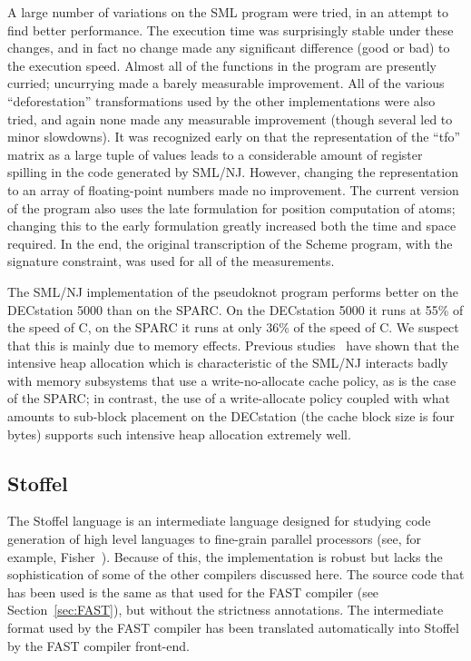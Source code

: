 A large number of variations on the SML program were tried, in an
attempt to find better performance. The execution time was
surprisingly stable under these changes, and in fact no change made
any significant difference (good or bad) to the execution
speed. Almost all of the functions in the program are presently
curried; uncurrying made a barely measurable improvement. All of the
various ``deforestation'' transformations used by the other
implementations were also tried, and again none made any measurable
improvement (though several led to minor slowdowns). It was recognized
early on that the representation of the ``tfo'' matrix as a large
tuple of values leads to a considerable amount of register spilling in
the code generated by SML/NJ\@. However, changing the representation
to an array of floating-point numbers made no improvement. The current
version of the program also uses the late formulation for position
computation of atoms; changing this to the early formulation greatly
increased both the time and space required. In the end, the original
transcription of the Scheme program, with the signature constraint,
was used for all of the measurements.

The SML/NJ implementation of the pseudoknot program performs better on the DECstation 5000 than
on the SPARC. On the DECstation 5000 it runs at 55\% of the speed of C,
on the SPARC it runs at only 36\% of the speed of C. We suspect that
this is mainly due to memory effects. Previous studies~\cite{Diw94}
have shown that the intensive heap allocation which is characteristic
of the SML/NJ interacts badly with memory subsystems that use a
write-no-allocate cache policy, as is the case of the SPARC; in
contrast, the use of a write-allocate policy coupled with what amounts
to sub-block placement on the DECstation (the cache block size is four
bytes) supports such intensive heap allocation extremely well.

\subsection{Stoffel}
The Stoffel language is an intermediate language designed for studying
code generation of high level languages to fine-grain parallel
processors (see, for example, Fisher~\cite{Fis84}). Because of this, the
implementation is robust but lacks the sophistication of some of the
other compilers discussed here. The source code that has been used is
the same as that used for the FAST compiler (see Section~\ref{sec:FAST}),
but without the strictness annotations. The intermediate format
used by the FAST compiler has been translated automatically into
Stoffel by the FAST compiler front-end.


